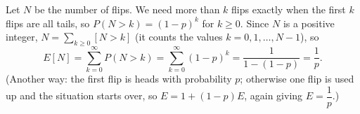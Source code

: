 Let $N$ be the number of flips. We need more than $k$ flips exactly when the first $k$ flips are all tails, so $P(N>k)=(1-p)^k$ for $k\ge0$. Since $N$ is a positive integer, $N=\sum_{k\ge0}\left[N>k\right]$ (it counts the values $k=0,1,\dots,N-1$), so
\[E[N]=\sum_{k=0}^{\infty}P(N>k)=\sum_{k=0}^{\infty}(1-p)^k=\dfrac{1}{1-(1-p)}=\boxed{\dfrac1p}.\]
(Another way: the first flip is heads with probability $p$; otherwise one flip is used up and the situation starts over, so $E=1+(1-p)E$, again giving $E=\dfrac1p$.)
